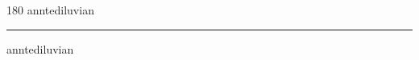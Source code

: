 
\begin{frame}
\begin{center}
\begin{turn}{180}
{\fontsize{2.5cm}{1em}\selectfont anntediluvian}
\end{turn}
\vspace{1em}\par  
\hrule
\vspace{1em}\par  
{\fontsize{2.5cm}{1em}\selectfont anntediluvian}
\end{center}
\end{frame}
